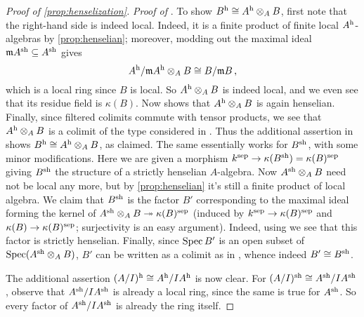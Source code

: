 \documentclass[a4paper, 10pt, oneside, DIV=9, chapterprefix=true, numbers=enddot, bibliography=totoc]{scrbook}
\begin{document}
\begin{proof}[Proof of \cref{prop:henselization}]
	\emph{Proof of }. To show $B^{\mathrm{h}}\cong A^{\mathrm{h}}\otimes_AB$, first note that the right-hand side is indeed local. Indeed, it is a finite product of finite local $A^{\mathrm{h}}$-algebras by \cref{prop:henselian}; moreover, modding out the maximal ideal $\mathfrak{m} A^{\mathrm{sh}}\subseteq A^{\mathrm{sh}}$ gives
	\begin{equation*}
		A^{\mathrm{h}}/\mathfrak{m} A^{\mathrm{h}}\otimes_AB\cong B/\mathfrak{m} B\,,
	\end{equation*}
	which is a local ring since $B$ is local. So $A^{\mathrm{h}}\otimes_AB$ is indeed local, and we even see that its residue field is $\kappa(B)$. Now  shows that $A^{\mathrm{h}}\otimes_AB$ is again henselian. Finally, since filtered colimits commute with tensor products, we see that $A^{\mathrm{h}}\otimes_AB$ is a colimit of the type considered in . Thus the additional assertion in  shows $B^{\mathrm{h}}\cong A^{\mathrm{h}}\otimes_AB$, as claimed. The same essentially works for $B^{\mathrm{sh}}$, with some minor modifications. Here we are given a morphism $k^\sep\morphism\kappa(B^\sh)=\kappa(B)^\sep$ giving $B^{\mathrm{sh}}$ the structure of a strictly henselian $A$-algebra. Now $A^{\mathrm{sh}}\otimes_AB$ need not be local any more, but by \cref{prop:henselian} it's still a finite product of local algebra. We claim that $B^{\mathrm{sh}}$ is the factor $B'$ corresponding to the maximal ideal forming the kernel of $A^\sh\otimes _AB\epimorphism \kappa(B)^\sep$ (induced by $k^\sep\morphism\kappa(B)^\sep$ and $\kappa(B)\morphism \kappa(B)^\sep$; surjectivity is an easy argument). Indeed, using  we see that this factor is strictly henselian. Finally, since $\operatorname{Spec} B'$ is an open subset of $\operatorname{Spec} (A^{\mathrm{sh}}\otimes_AB)$, $B'$ can be written as a colimit as in , whence indeed $B'\cong B^{\mathrm{sh}}$.
	
	The additional assertion $(A/I)^{\mathrm{h}}\cong A^{\mathrm{h}}/IA^{\mathrm{h}}$ is now clear. For $(A/I)^{\mathrm{sh}}\cong A^{\mathrm{sh}}/IA^{\mathrm{sh}}$, observe that $A^{\mathrm{sh}}/IA^{\mathrm{sh}}$ is already a local ring, since the same is true for $A^{\mathrm{sh}}$. So every factor of $A^{\mathrm{sh}}/IA^{\mathrm{sh}}$ is already the ring itself.
	

\end{proof}
\end{document}
